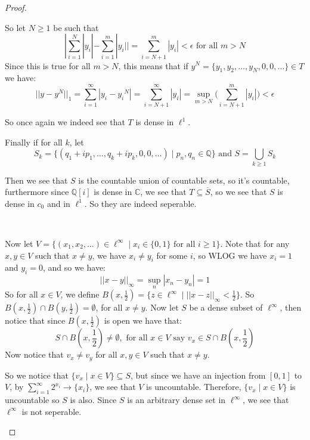 \documentclass{article}
\newcommand{\C}{\mathbb{C}}
\newcommand{\Q}{\mathbb{Q}}
\theoremstyle{definition}
\theoremstyle{remark}
\theoremstyle{definition}
\begin{document}
\begin{proof}
\begin{enumerate}[label = (\alph*)]
\begin{itemize}
    So let $N\geq 1$ be such that\begin{equation}
        |\sum_{i=1}^N|y_i| - \sum_{i=1}^m |y_i|| = \sum_{i=N+1}^m|y_i|<\epsilon \text{ for all }m>N
    \end{equation}
Since this is true for all $m>N$, this means that if $y^N = \{y_1, y_2,\dots,y_N,0,0,\dots\}\in T$ we have:\begin{equation}
    ||y-y^N||_1 = \sum_{i=1}^\infty |y_i-{y_i}^N| = \sum_{i=N+1}^\infty |y_i| = \sup_{m>N}\bigg(\sum_{i=N+1}^m|y_i|\bigg)<\epsilon
\end{equation}

So once again we indeed see that $T$ is dense in $\ell^1$.
\end{itemize}

Finally if for all $k$, let \begin{equation}S_k = \{(q_1+ip_1,\dots,q_k+ip_k,0,0,\dots) \mid p_n,q_n\in \Q\} \text{ and }S=\bigcup_{k\geq 1}S_k\end{equation}

Then we see that $S$ is the countable union of countable sets, so it's countable, furthermore since $\Q[i]$ is dense in $\C$, we see that $T\subseteq \overline{S}$, so we see that $S$ is dense
in $c_0$ and in $\ell^1$. So they are indeed seperable.

\

Now let $V = \{(x_1,x_2,\dots)\in \ell^\infty \mid x_i\in \{0,1\}\text{ for all }i\geq 1\}$. Note that for any $x,y\in V$ such that $x\neq y$, we have $x_i\neq y_i$ for some $i$, so WLOG we have $x_i = 1$ and $y_i = 0$, and so we have:\begin{equation}
    ||x-y||_\infty = \sup_{n} |x_n-y_n| = 1
\end{equation}
So for all $x\in V$, we define $B(x,\frac{1}{2}) = \{z\in \ell^\infty \mid ||x-z||_\infty <\frac{1}{2}\}$. So $B(x,\frac{1}{2})\cap B(y,\frac{1}{2}) = \emptyset$, for all $x\neq y$.
Now let $S$ be a dense subset of $\ell^\infty$, then notice that since $B(x,\frac{1}{2})$ is open we have that:\begin{equation}
    S\cap B(x,\frac{1}{2}) \neq \emptyset, \text{ for all }x\in V\text{ say }v_x\in S\cap B(x,\frac{1}{2}) 
\end{equation}
Now notice that $v_x\neq v_y$ for all $x,y\in V$ such that $x\neq y$.

So we notice that $\{v_x\mid x\in V\} \subseteq S$, but since we have an injection from $[0,1]$ to $V$, by $\sum_{i=1}^\infty 2^{x_i} \rightarrow \{x_i\}$, we see that $V$ is uncountable.
Therefore, $\{v_x\mid x\in V\}$ is uncountable so $S$ is also. Since $S$ is an arbitrary dense set in $\ell^\infty$, we see that $\ell^\infty$ is not seperable.
\end{enumerate}
    \end{proof}
\end{document}
